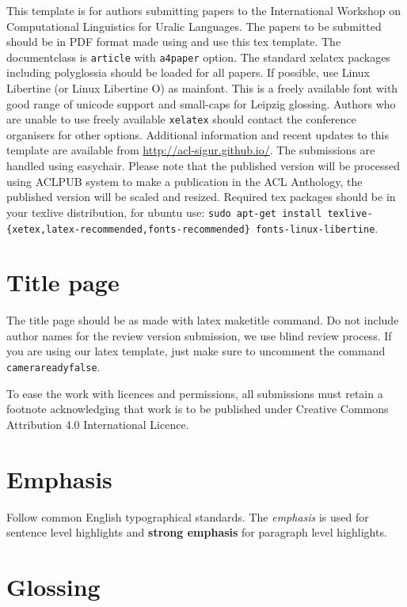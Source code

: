 \documentclass[a4paper,notitlepage]{article}
\begin{document}
This template is for authors submitting papers to the International Workshop on
Computational Linguistics for Uralic Languages. The papers to be submitted
should be in PDF format made using \XeLaTeX{} and use this tex template.  The
documentclass is \texttt{article} with \texttt{a4paper} option.  The standard
xelatex packages including polyglossia should be loaded for all papers. If
possible, use Linux Libertine (or Linux Libertine O) as mainfont.  This is a
freely available font with good range of unicode support and small-caps for
Leipzig glossing.  Authors who are unable to use freely available
\texttt{xelatex} should contact the conference organisers for other options.
Additional information and recent updates to this template are available from
\url{http://acl-sigur.github.io/}. The submissions are handled using easychair.
Please note that the published version will be processed using ACLPUB system
to make a publication in the ACL Anthology, the published version will
be scaled and resized.
Required tex packages should be in your texlive distribution, for ubuntu use:
\texttt{sudo apt-get install
texlive-\{xetex,latex-recommended,fonts-recommended\} fonts-linux-libertine}.


\section{Title page}

The title page should be as made with latex maketitle command. Do not include
author names for the review version submission, we use blind review process. If
you are using our latex template, just make sure to uncomment the command
\texttt{camerareadyfalse}.

To ease the work with licences and permissions, all submissions must retain
a footnote acknowledging that work is to be published under Creative
Commons Attribution 4.0 International Licence.

\section{Emphasis}

Follow common English typographical standards. The \emph{emphasis} is used for
sentence level highlights and \textbf{strong emphasis} for paragraph level
highlights.

\section{Glossing}
\end{document}
